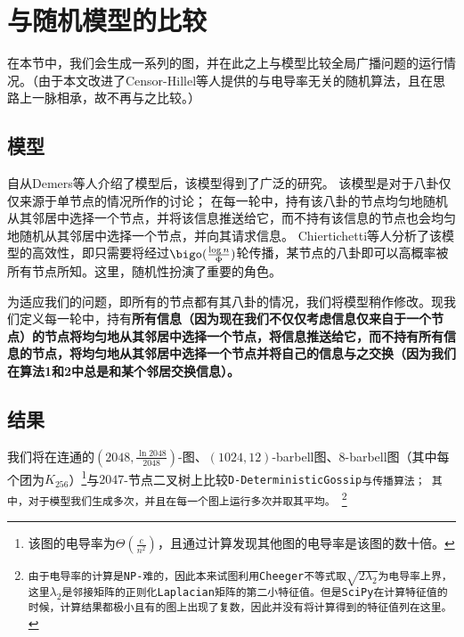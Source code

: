 \documentclass[12pt]{article}
\begin{document}
\section{与随机\pullpush 模型的比较}
在本节中，我们会生成一系列的图，并在此之上与\pullpush 模型比较全局广播问题的运行情况。（由于本文改进了Censor-Hillel等人提供的与电导率无关的随机算法\cite{Censor-HillelGlobalComputationPoorly2012}，且在思路上一脉相承，故不再与之比较。）
\subsection{\pullpush 模型}
自从Demers等人介绍了\pullpush 模型\cite{DemersEpidemicAlgorithmsReplicated1987}后，该模型得到了广泛的研究。
该模型是对于八卦仅仅来源于单节点的情况所作的讨论；
在每一轮中，持有该八卦的节点均匀地随机从其邻居中选择一个节点，并将该信息推送给它，而不持有该信息的节点也会均匀地随机从其邻居中选择一个节点，并向其请求信息。
Chiertichetti等人分析了该模型的高效性，即只需要将经过$\bigo(\frac{\log n}{\Phi})$轮传播，某节点的八卦即可以高概率被所有节点所知。这里，随机性扮演了重要的角色。

为适应我们的问题，即所有的节点都有其八卦的情况，我们将\pullpush 模型稍作修改。现我们定义每一轮中，持有\bf{所有信息}（因为现在我们不仅仅考虑信息仅来自于一个节点）的节点将均匀地从其邻居中选择一个节点，将信息推送给它，而不持有所有信息的节点，将均匀地从其邻居中选择一个节点并将自己的信息与之\bf{交换}（因为我们在算法1和2中总是和某个邻居交换信息）。
\subsection{结果}
我们将在连通的$(2048,\frac{\ln 2048}{2048})$-\erdos  图\cite{Erdosevolutionrandomgraphs1960}、$(1024, 12)$-barbell图\cite{AlonManyRandomWalks2007}、$8$-barbell图（其中每个团为$K_{256}$）\footnote{该图的电导率为$\Theta(\frac{c}{n^2})$\cite{Censor-HillelFastInformationSpreading2011}，且通过计算发现其他图的电导率是该图的数十倍。}与$2047$-节点二叉树上比较\tt{D-DeterministicGossip}与\pullpush 传播算法；
其中，对于\erdos 模型我们生成多次，并且在每一个图上运行\pullpush 多次并取其平均。
\footnote{由于电导率的计算是NP-难的，因此本来试图利用Cheeger不等式\cite{Cheegerlowerboundsmallest1969}取$\sqrt{2\lambda_2}$为电导率上界，这里$\lambda_2$是邻接矩阵的正则化Laplacian矩阵的第二小特征值。但是SciPy在计算特征值的时候，计算结果都极小且有的图上出现了复数，因此并没有将计算得到的特征值列在这里。}
\end{document}
